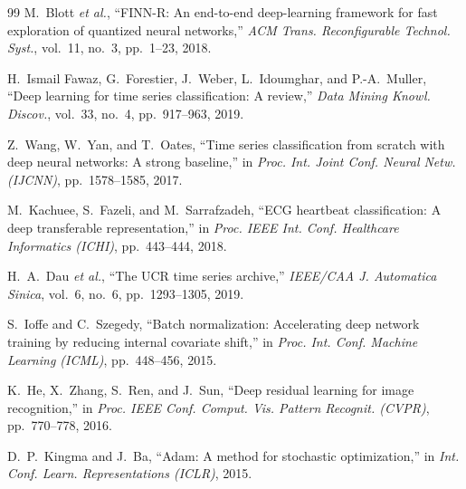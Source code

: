 \documentclass[12pt, letterpaper]{article}
\begin{document}
\begin{thebibliography}{99}
M.~Blott \textit{et al.},
``FINN-R: An end-to-end deep-learning framework for fast exploration of quantized neural networks,''
\textit{ACM Trans. Reconfigurable Technol. Syst.},
vol.~11, no.~3, pp.~1--23, 2018.

H.~Ismail Fawaz, G.~Forestier, J.~Weber, L.~Idoumghar, and P.-A.~Muller,
``Deep learning for time series classification: A review,''
\textit{Data Mining Knowl. Discov.},
vol.~33, no.~4, pp.~917--963, 2019.

Z.~Wang, W.~Yan, and T.~Oates,
``Time series classification from scratch with deep neural networks: A strong baseline,''
in \textit{Proc. Int. Joint Conf. Neural Netw. (IJCNN)},
pp.~1578--1585, 2017.

M.~Kachuee, S.~Fazeli, and M.~Sarrafzadeh,
``ECG heartbeat classification: A deep transferable representation,''
in \textit{Proc. IEEE Int. Conf. Healthcare Informatics (ICHI)},
pp.~443--444, 2018.

H.~A.~Dau \textit{et al.},
``The UCR time series archive,''
\textit{IEEE/CAA J. Automatica Sinica},
vol.~6, no.~6, pp.~1293--1305, 2019.

S.~Ioffe and C.~Szegedy,
``Batch normalization: Accelerating deep network training by reducing internal covariate shift,''
in \textit{Proc. Int. Conf. Machine Learning (ICML)},
pp.~448--456, 2015.

K.~He, X.~Zhang, S.~Ren, and J.~Sun,
``Deep residual learning for image recognition,''
in \textit{Proc. IEEE Conf. Comput. Vis. Pattern Recognit. (CVPR)},
pp.~770--778, 2016.

D.~P.~Kingma and J.~Ba,
``Adam: A method for stochastic optimization,''
in \textit{Int. Conf. Learn. Representations (ICLR)},
2015.

\end{thebibliography}
\end{document}
